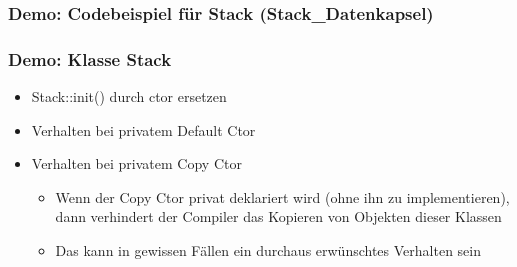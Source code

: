 \subsubsection{Demo: Codebeispiel für Stack (Stack\_Datenkapsel)}



\subsubsection{Demo: Klasse Stack}
\begin{itemize}
	\item Stack::init() durch ctor ersetzen
	\item Verhalten bei privatem Default Ctor
	\item Verhalten bei privatem Copy Ctor
	\begin{itemize}
		\item Wenn der Copy Ctor privat deklariert wird (ohne ihn zu implementieren), dann verhindert der Compiler das Kopieren von Objekten dieser Klassen
		\item Das kann in gewissen Fällen ein durchaus erwünschtes Verhalten sein
	\end{itemize}
\end{itemize}

